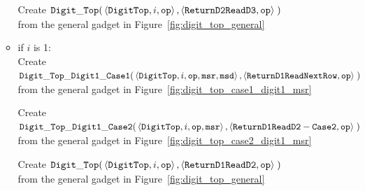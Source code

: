 \begin{itemize}
\begin{itemize}
        Create
        $\begin{aligned}[t]
            {\tt Digit\_Top}(& \left \langle {\tt DigitTop}, i, {\tt op} \right\rangle,
                    \left \langle {\tt ReturnD2ReadD3}, {\tt op} \right\rangle \;)
        \end{aligned}$ \\ from the general gadget in Figure~\ref{fig:digit_top_general}
        \vspace{.5cm}

        \item if $i$ is 1: \\
        Create
        $\begin{aligned}[t]
            {\tt Digit\_Top\_Digit1\_Case1}(& \left \langle {\tt DigitTop}, i, {\tt op}, {\tt msr}, {\tt msd} \right\rangle,
                               \left \langle {\tt ReturnD1ReadNextRow},  {\tt op} \right\rangle \;)
        \end{aligned}$ \\ from the general gadget in Figure~\ref{fig:digit_top_case1_digit1_msr}
        \vspace{.5cm}

        Create
        $\begin{aligned}[t]
            {\tt Digit\_Top\_Digit1\_Case2}(& \left \langle {\tt DigitTop}, i, {\tt op}, {\tt msr} \right\rangle,
                               \left \langle {\tt ReturnD1ReadD2-Case2}, {\tt op}  \right\rangle \;)
        \end{aligned}$ \\ from the general gadget in Figure~\ref{fig:digit_top_case2_digit1_msr}
        \vspace{0.5cm}

        Create
        $\begin{aligned}[t]
            {\tt Digit\_Top}(& \left \langle {\tt DigitTop}, i, {\tt op} \right\rangle,
                    \left \langle {\tt ReturnD1ReadD2}, {\tt op} \right\rangle \;)
        \end{aligned}$ \\ from the general gadget in Figure~\ref{fig:digit_top_general}
        \vspace{.5cm}


    \end{itemize}


\end{itemize}
